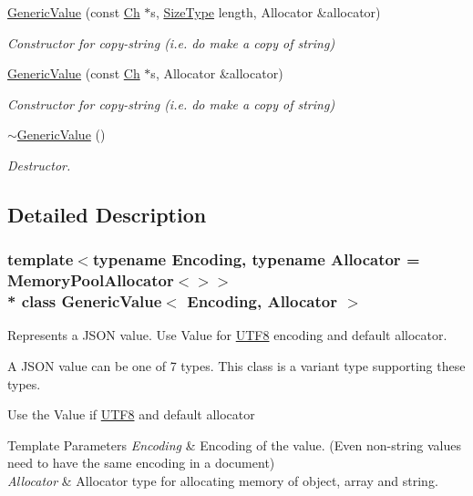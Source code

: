 \begin{DoxyCompactItemize}
\hyperlink{classGenericValue_a9ec2c7cda8c8845acfa3565c6b1b4e10}{Generic\+Value} (const \hyperlink{classGenericValue_ade0e0ce64ccd5d852da57a35e720bafb}{Ch} $\ast$s, \hyperlink{rapidjson_8h_a5ed6e6e67250fadbd041127e6386dcb5}{Size\+Type} length, Allocator \&allocator)
\begin{DoxyCompactList}\small\item\em Constructor for copy-\/string (i.\+e. do make a copy of string) \end{DoxyCompactList}\item 
\hyperlink{classGenericValue_a9b72b2e3347d4cd77b16c3b45e8decf1}{Generic\+Value} (const \hyperlink{classGenericValue_ade0e0ce64ccd5d852da57a35e720bafb}{Ch} $\ast$s, Allocator \&allocator)
\begin{DoxyCompactList}\small\item\em Constructor for copy-\/string (i.\+e. do make a copy of string) \end{DoxyCompactList}\item 
\hyperlink{classGenericValue_a213ba89ef5ef961a5e655bd8c78ac9f4}{$\sim$\+Generic\+Value} ()
\begin{DoxyCompactList}\small\item\em Destructor. \end{DoxyCompactList}\end{DoxyCompactItemize}


\subsection{Detailed Description}
\subsubsection*{template$<$typename Encoding, typename Allocator = Memory\+Pool\+Allocator$<$$>$$>$\\*
class Generic\+Value$<$ Encoding, Allocator $>$}

Represents a J\+S\+ON value. Use Value for \hyperlink{structUTF8}{U\+T\+F8} encoding and default allocator. 

A J\+S\+ON value can be one of 7 types. This class is a variant type supporting these types.

Use the Value if \hyperlink{structUTF8}{U\+T\+F8} and default allocator


\begin{DoxyTemplParams}{Template Parameters}
{\em Encoding} & Encoding of the value. (Even non-\/string values need to have the same encoding in a document) \\
\hline
{\em Allocator} & Allocator type for allocating memory of object, array and string. \\
\hline
\end{DoxyTemplParams}


